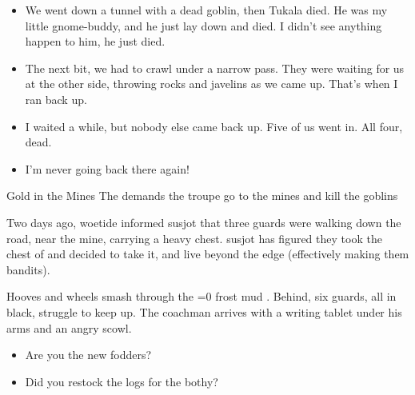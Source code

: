\begin{multicols}{2}
\begin{speechtext}
\begin{itemize}
    \item
    We went down a tunnel with a dead goblin, then Tukala died.
    He was my little gnome-buddy, and he just lay down and died.
    I didn't see anything happen to him, he just died.
    
    \item
    The next bit, we had to crawl under a narrow pass.
    They were waiting for us at the other side, throwing rocks and javelins as we came up.
    That's when I ran back up.
    
    \item
    I waited a while, but nobody else came back up.
    Five of us went in.
    All four, dead.
    \item
    I'm never going back there again!
  \end{itemize}
\end{speechtext}

{Gold in the Mines}%
{The  demands the troupe go to the mines and kill the goblins}%

\begin{exampletext}
  Two days ago, \gls{woetide} informed \gls{susjot} that three \glspl{guard} were walking down the road, near the mine, carrying a heavy chest.
  \Gls{susjot} has figured they took the chest of  and decided to take it, and live beyond the \gls{edge} (effectively making them bandits).
\end{exampletext}

\begin{boxtext}
  Hooves and wheels smash through the
  \ifnum\value{temperature}=0%
    frost
  \else%
    mud
  \fi.
  Behind, six \glspl{guard}, all in black, struggle to keep up.
  The coachman arrives with a writing tablet under his arms and an angry scowl.
  \begin{speechtext}
    \begin{itemize}
      \item
      Are you the new \glspl{fodder}?
      \item
      Did you restock the logs for the \gls{bothy}?
    \end{itemize}
  \end{speechtext}
\end{boxtext}


\end{multicols}
